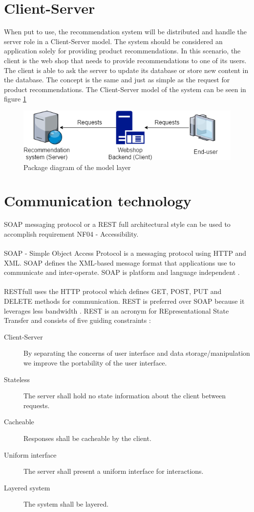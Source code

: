 \section{Client-Server}
When put to use, the recommendation system will be distributed and handle the server role in a Client-Server model. The system should be considered an application solely for providing product recommendations. In this scenario, the client is the web shop that needs to provide recommendations to one of its users. The client is able to ask the server to update its database or store new content in the database. The concept is the same and just as simple as the request for product recommendations. The Client-Server model of the system can be seen in figure \ref{fig:ClientServer}

\begin{figure}[H]
	\centering
	\includegraphics[width=.8\linewidth]{Figures/ClientServer.png}
	\caption{Package diagram of the model layer}
	\label{fig:ClientServer}
\end{figure}

\section{Communication technology}
SOAP messaging protocol or a \gls{REST} full architectural style can be used to accomplish requirement NF04 - Accessibility.\\\\ SOAP - Simple Object Access Protocol is a messaging protocol using \gls{HTTP} and \gls{XML}. SOAP defines the \gls{XML}-based message format that applications use to communicate and inter-operate. SOAP is platform and language independent \cite{SOAP}. \\\\ \gls{REST}full uses the \gls{HTTP} protocol which defines GET, POST, PUT and DELETE methods for communication. \Gls{REST} is preferred over SOAP because it leverages less bandwidth \cite{restfull}. 
\gls{REST} is an acronym for REpresentational State Transfer and consists of five guiding constraints \cite{rest}:
\begin{description}
\item [Client-Server] By separating the concerns of user interface and data storage/manipulation we improve the portability of the user interface.
\item [Stateless] The server shall hold no state information about the client between requests.
\item [Cacheable] Responses shall be cacheable by the client.
\item [Uniform interface] The server shall present a uniform interface for interactions.
\item [Layered system] The system shall be layered.
\end{description}



